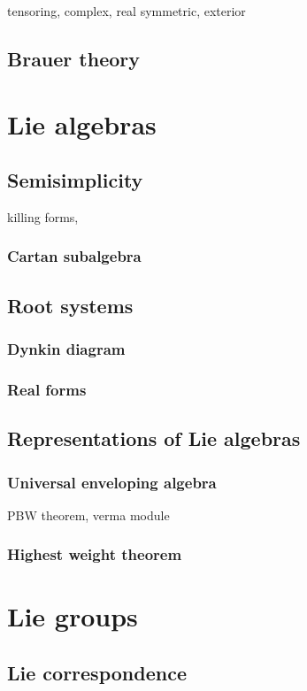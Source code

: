 \documentclass{../note}
\begin{document}
tensoring, complex, real
symmetric, exterior


\chapter{Brauer theory}






\part{Lie algebras}
\chapter{Semisimplicity}
killing forms,
\section{Cartan subalgebra}

\chapter{Root systems}
\section{Dynkin diagram}
\section{Real forms}

\chapter{Representations of Lie algebras}
\section{Universal enveloping algebra}
PBW theorem, verma module
\section{Highest weight theorem}



\part{Lie groups}
\chapter{Lie correspondence}
\end{document}

